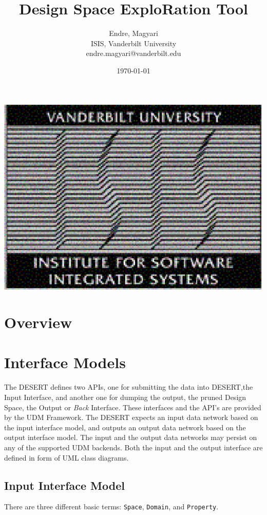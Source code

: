 \documentclass{article}
\title{Design Space ExploRation Tool}
\author{
Endre, Magyari\\
ISIS, Vanderbilt University\\
endre.magyari@vanderbilt.edu
}
\date{\today}
\begin{document}
\setcounter{figure}{1}
\maketitle

\vspace{3cm}
{\par\centering \includegraphics{isis.eps} \par}
\newpage
\section{Overview}
\section{Interface Models}
\begin{par}
The DESERT defines two APIs, one for submitting the data into DESERT,the Input Interface, and another one for dumping the output, the pruned Design Space, the Output or {\it Back} Interface. 
These interfaces and the API's are provided by the UDM Framework\cite{UDM}. The DESERT expects an input data network based on the input interface model, and outputs an output data network based on the output interface model. The input and the output data networks may persist on any of the supported UDM backends.
Both the input and the output interface are defined in form of UML class diagrams. 

\end{par}
\subsection{Input Interface Model}
{\par 
There are three different basic terms: {\tt Space}, {\tt Domain}, and {\tt Property}. }
\end{document}
